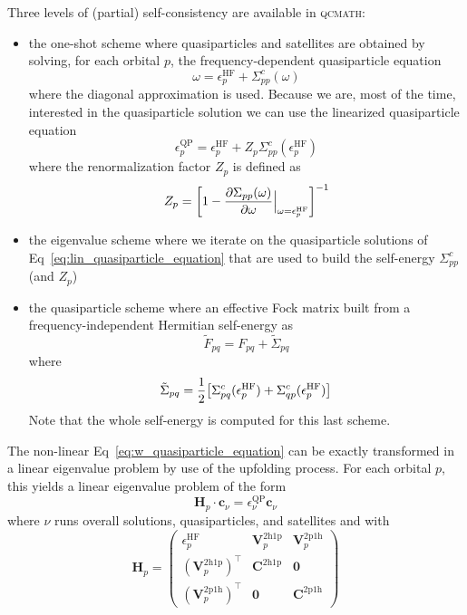 \documentclass[aip,jcp,reprint,noshowkeys,superscriptaddress]{revtex4-1}
\newcommand{\T}[1]{#1^{\intercal}}
\newcommand{\HF}{\text{HF}}
\newcommand{\bH}{\boldsymbol{H}}
\newcommand{\bc}{\boldsymbol{c}}
\newcommand{\ep}{\epsilon}
\newcommand{\bV}[2]{\boldsymbol{V}_{#1}^{#2}}
\newcommand{\bCs}[2]{\boldsymbol{C}_{#1}^{#2}}
\newcommand{\bO}{\boldsymbol{0}}
\newcommand{\eHF}[1]{\epsilon^\text{HF}_{#1}}
\newcommand{\eQP}[1]{\epsilon^\text{QP}_{#1}}
\newcommand{\epss}[2]{\epsilon_{#1}^{#2}}
\newcommand{\Z}[1]{Z_{#1}}
\newcommand{\qcmath}{\textsc{qcmath}\xspace}
\begin{document}
Three levels of (partial) self-consistency are available in \qcmath:
\begin{itemize}
\item the one-shot scheme where quasiparticles and satellites are obtained by solving, for each orbital $p$, the frequency-dependent quasiparticle equation 
\begin{equation}
\label{eq:w_quasiparticle_equation}
\omega = \eHF{p} + \Sigma_{pp}^c(\omega)
\end{equation}
where the diagonal approximation is used. Because we are, most of the time, interested in the quasiparticle solution we can use the linearized quasiparticle equation
\begin{equation}
\label{eq:lin_quasiparticle_equation}
\eQP{p} = \eHF{p} + \Z{p} \Sigma_{pp}^c(\eHF{p})
\end{equation}
where the renormalization factor $\Z{p}$ is defined as 
\begin{equation}
\Z{p}=\qty[ 1-\frac{\partial \Sigma_{pp}(\omega)}{\partial \omega}\Bigr\rvert_{\omega =\eHF{p} } ]^{-1}
\end{equation}
\item the eigenvalue scheme where we iterate on the quasiparticle solutions of Eq~\eqref{eq:lin_quasiparticle_equation} that are used to build the self-energy $\Sigma_{pp}^c$ (and $\Z{p}$)
\item the quasiparticle scheme where an effective Fock matrix built from a frequency-independent Hermitian self-energy as \cite{Monino_2021}
\begin{equation}
\tilde{F}_{pq}= F_{pq} + \tilde{\Sigma}_{pq}
\end{equation}
where 
\begin{equation}
\tilde{\Sigma}_{pq}=\frac{1}{2}\qty[\Sigma_{pq}^c(\eHF{p}) + \Sigma_{qp}^c(\eHF{p})]
\end{equation}
Note that the whole self-energy is computed for this last scheme.
\end{itemize}
The non-linear Eq~\eqref{eq:w_quasiparticle_equation} can be exactly transformed in a linear eigenvalue problem by use of the upfolding process\cite{Backhouse_2020a,Bintrim_2021,Monino_2022}. For each orbital $p$, this yields a linear eigenvalue problem of the form
\begin{equation}
	\bH_{p} \cdot \bc_{\nu} = \ep_{\nu}^{\text{QP}} \bc_{\nu}
\end{equation}
where $\nu$ runs overall solutions, quasiparticles, and satellites and with \cite{Tolle_2023}
\begin{equation}
	\bH_{p} = 
	\begin{pmatrix}
		\epss{p}{\HF}		&	\bV{p}{\text{2h1p}}	&	\bV{p}{\text{2p1h}}
		\\
		\T{(\bV{p}{\text{2h1p}})}	&	\bCs{}{\text{2h1p}}			&	\bO
		\\
		\T{(\bV{p}{\text{2p1h}})}	&	\bO				&	\bCs{}{\text{2p1h}}	
	\end{pmatrix}
\end{equation}
\end{document}
